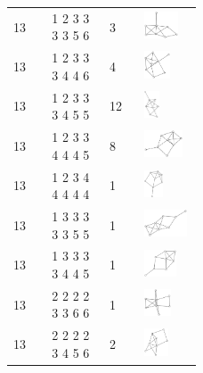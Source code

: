 \begin{footnotesize}
\begin{longtable}{m{0.07\linewidth} m{0.15\linewidth} m{0.05\linewidth} m{0.15\linewidth}}
13 & 1 2 3 3 3 3 5 6 & 3 & \includegraphics[height=0.8cm]{15-universal-graphs/img/degree-sequences-example-graphs/graph-4-8-43}\\
13 & 1 2 3 3 3 4 4 6 & 4 & \includegraphics[height=0.8cm]{15-universal-graphs/img/degree-sequences-example-graphs/graph-4-8-44}\\
13 & 1 2 3 3 3 4 5 5 & 12 & \includegraphics[height=0.8cm]{15-universal-graphs/img/degree-sequences-example-graphs/graph-4-8-45}\\
13 & 1 2 3 3 4 4 4 5 & 8 & \includegraphics[height=0.8cm]{15-universal-graphs/img/degree-sequences-example-graphs/graph-4-8-46}\\
13 & 1 2 3 4 4 4 4 4 & 1 & \includegraphics[height=0.8cm]{15-universal-graphs/img/degree-sequences-example-graphs/graph-4-8-47}\\
13 & 1 3 3 3 3 3 5 5 & 1 & \includegraphics[height=0.8cm]{15-universal-graphs/img/degree-sequences-example-graphs/graph-4-8-48}\\
13 & 1 3 3 3 3 4 4 5 & 1 & \includegraphics[height=0.8cm]{15-universal-graphs/img/degree-sequences-example-graphs/graph-4-8-49}\\
13 & 2 2 2 2 3 3 6 6 & 1 & \includegraphics[height=0.8cm]{15-universal-graphs/img/degree-sequences-example-graphs/graph-4-8-50}\\
13 & 2 2 2 2 3 4 5 6 & 2 & \includegraphics[height=0.8cm]{15-universal-graphs/img/degree-sequences-example-graphs/graph-4-8-51}\\

\end{longtable}
\end{footnotesize}

